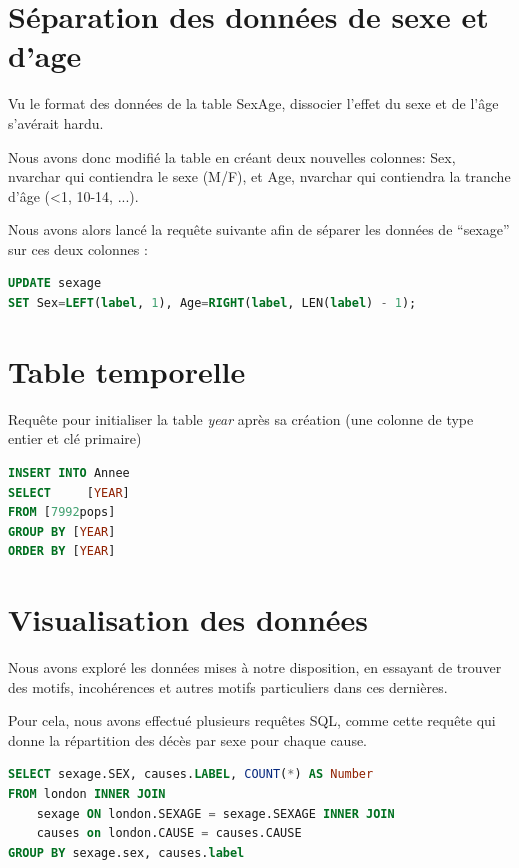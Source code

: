 \section{Séparation des données de sexe et d'age}

    Vu le format des données de la table SexAge, dissocier l'effet du sexe et de l'âge s'avérait hardu.

    Nous avons donc modifié la table en créant deux nouvelles colonnes: Sex, nvarchar qui contiendra le sexe (M/F), et Age,
    nvarchar qui contiendra la tranche d'âge (<1, 10-14, ...).

    Nous avons alors lancé la requête suivante afin de séparer les données de ``sexage'' sur ces deux colonnes :

    \begin{lstlisting}[frame=single, language=SQL]
UPDATE sexage
SET Sex=LEFT(label, 1), Age=RIGHT(label, LEN(label) - 1);
    \end{lstlisting}

\section{Table temporelle}

    Requête pour initialiser la table \textit{year} après sa création (une colonne de type entier et clé primaire)

    \begin{lstlisting}[frame=single, language=SQL]
INSERT INTO Annee
SELECT     [YEAR]
FROM [7992pops]
GROUP BY [YEAR]
ORDER BY [YEAR]
    \end{lstlisting}

\section{Visualisation des données}

    Nous avons exploré les données mises à notre disposition, en essayant de trouver des motifs, incohérences et autres motifs particuliers
    dans ces dernières.

    Pour cela, nous avons effectué plusieurs requêtes SQL, comme cette requête qui donne la répartition des décès par sexe pour chaque
    cause.

    \begin{lstlisting}[frame=single, language=SQL]
SELECT sexage.SEX, causes.LABEL, COUNT(*) AS Number
FROM london INNER JOIN
    sexage ON london.SEXAGE = sexage.SEXAGE INNER JOIN
    causes on london.CAUSE = causes.CAUSE
GROUP BY sexage.sex, causes.label
    \end{lstlisting}

